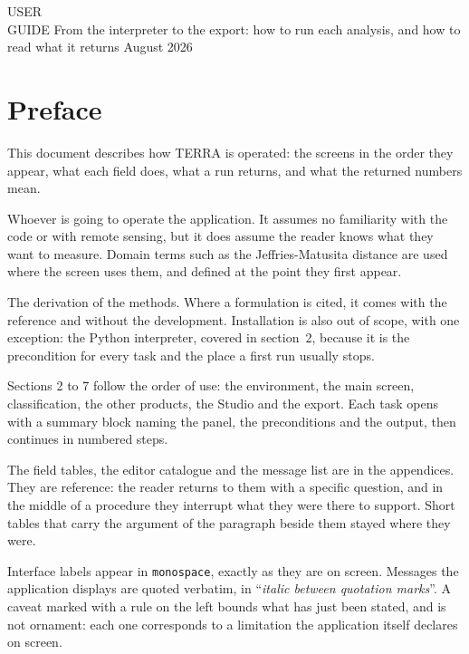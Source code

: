\documentclass[12pt,a4paper]{article}
\newcommand{\msg}[1]{``\textit{#1}''}
\begin{document}
\terracapaperiodico
  {USER\\GUIDE}
  {From the interpreter to the export: how to run each analysis, and how to
   read what it returns}
  {August 2026}

\tableofcontents
\newpage

\section*{Preface}

This document describes how TERRA is operated: the screens in the order they
appear, what each field does, what a run returns, and what the returned numbers
mean.

 Whoever is going to operate the application. It assumes
no familiarity with the code or with remote sensing, but it does assume the
reader knows what they want to measure. Domain terms such as the
Jeffries-Matusita distance are used where the screen uses them, and defined at
the point they first appear.

 The derivation of the methods. Where a
formulation is cited, it comes with the reference and without the development.
Installation is also out of scope, with one exception: the Python interpreter,
covered in section~2, because it is the precondition for every task and the
place a first run usually stops.

 Sections 2 to 7 follow the order of use: the
environment, the main screen, classification, the other products, the Studio
and the export. Each task opens with a summary block naming the panel, the
preconditions and the output, then continues in numbered steps.

The field tables, the editor catalogue and the message list are in the
appendices. They are reference: the reader returns to them with a specific
question, and in the middle of a procedure they interrupt what they were there
to support. Short tables that carry the argument of the paragraph beside them
stayed where they were.

 Interface labels appear in \texttt{monospace},
exactly as they are on screen. Messages the application displays are quoted
verbatim, in \msg{italic between quotation marks}. A caveat marked with a rule
on the left bounds what has just been stated, and is not ornament: each one
corresponds to a limitation the application itself declares on screen.
\end{document}

